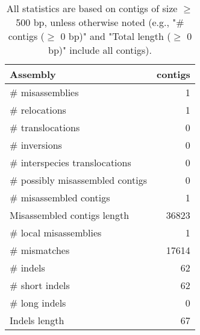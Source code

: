 \documentclass[12pt,a4paper]{article}
\begin{document}
\begin{table}[ht]
\begin{center}
\caption{All statistics are based on contigs of size $\geq$ 500 bp, unless otherwise noted (e.g., "\# contigs ($\geq$ 0 bp)" and "Total length ($\geq$ 0 bp)" include all contigs).}
\begin{tabular}{|l*{1}{|r}|}
\hline
Assembly & contigs \\ \hline
\# misassemblies & 1 \\ \hline
\hspace{5mm}\# relocations & 1 \\ \hline
\hspace{5mm}\# translocations & 0 \\ \hline
\hspace{5mm}\# inversions & 0 \\ \hline
\hspace{5mm}\# interspecies translocations & 0 \\ \hline
\# possibly misassembled contigs & 0 \\ \hline
\# misassembled contigs & 1 \\ \hline
Misassembled contigs length & 36823 \\ \hline
\# local misassemblies & 1 \\ \hline
\# mismatches & 17614 \\ \hline
\# indels & 62 \\ \hline
\hspace{5mm}\# short indels & 62 \\ \hline
\hspace{5mm}\# long indels & 0 \\ \hline
Indels length & 67 \\ \hline
\end{tabular}
\end{center}
\end{table}
\end{document}

